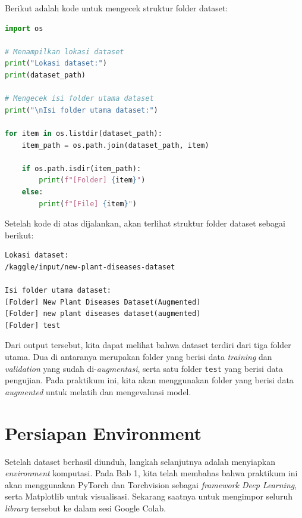 Berikut adalah kode untuk mengecek struktur folder dataset:

\begin{lstlisting}[language=Python, caption=Mengecek struktur folder dataset]
import os

# Menampilkan lokasi dataset
print("Lokasi dataset:")
print(dataset_path)

# Mengecek isi folder utama dataset
print("\nIsi folder utama dataset:")

for item in os.listdir(dataset_path):
    item_path = os.path.join(dataset_path, item)

    if os.path.isdir(item_path):
        print(f"[Folder] {item}")
    else:
        print(f"[File] {item}")
\end{lstlisting}

Setelah kode di atas dijalankan, akan terlihat struktur folder dataset sebagai berikut:

\begin{outputcode}[H]
\begin{lstlisting}[language={}]
Lokasi dataset:
/kaggle/input/new-plant-diseases-dataset

Isi folder utama dataset:
[Folder] New Plant Diseases Dataset(Augmented)
[Folder] new plant diseases dataset(augmented)
[Folder] test
\end{lstlisting}
\caption{Output struktur folder dataset}
\end{outputcode}

Dari output tersebut, kita dapat melihat bahwa dataset terdiri dari tiga folder utama. Dua di antaranya merupakan folder yang berisi data \textit{training} dan \textit{validation} yang sudah di-\textit{augmentasi}, serta satu folder \texttt{test} yang berisi data pengujian. Pada praktikum ini, kita akan menggunakan folder yang berisi data \textit{augmented} untuk melatih dan mengevaluasi model.

\section{Persiapan Environment}

Setelah dataset berhasil diunduh, langkah selanjutnya adalah menyiapkan \textit{environment} komputasi. Pada Bab 1, kita telah membahas bahwa praktikum ini akan menggunakan PyTorch dan Torchvision sebagai \textit{framework Deep Learning}, serta Matplotlib untuk visualisasi. Sekarang saatnya untuk mengimpor seluruh \textit{library} tersebut ke dalam sesi Google Colab.

